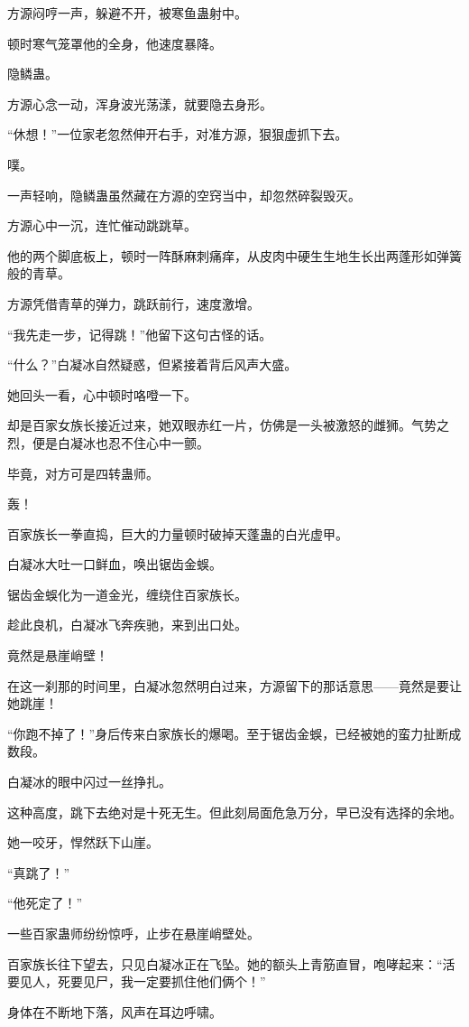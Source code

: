 \begin{this_body}
方源闷哼一声，躲避不开，被寒鱼蛊射中。

顿时寒气笼罩他的全身，他速度暴降。

隐鳞蛊。

方源心念一动，浑身波光荡漾，就要隐去身形。

“休想！”一位家老忽然伸开右手，对准方源，狠狠虚抓下去。

噗。

一声轻响，隐鳞蛊虽然藏在方源的空窍当中，却忽然碎裂毁灭。

方源心中一沉，连忙催动跳跳草。

他的两个脚底板上，顿时一阵酥麻刺痛痒，从皮肉中硬生生地生长出两蓬形如弹簧般的青草。

方源凭借青草的弹力，跳跃前行，速度激增。

“我先走一步，记得跳！”他留下这句古怪的话。

“什么？”白凝冰自然疑惑，但紧接着背后风声大盛。

她回头一看，心中顿时咯噔一下。

却是百家女族长接近过来，她双眼赤红一片，仿佛是一头被激怒的雌狮。气势之烈，便是白凝冰也忍不住心中一颤。

毕竟，对方可是四转蛊师。

轰！

百家族长一拳直捣，巨大的力量顿时破掉天蓬蛊的白光虚甲。

白凝冰大吐一口鲜血，唤出锯齿金蜈。

锯齿金蜈化为一道金光，缠绕住百家族长。

趁此良机，白凝冰飞奔疾驰，来到出口处。

竟然是悬崖峭壁！

在这一刹那的时间里，白凝冰忽然明白过来，方源留下的那话意思——竟然是要让她跳崖！

“你跑不掉了！”身后传来白家族长的爆喝。至于锯齿金蜈，已经被她的蛮力扯断成数段。

白凝冰的眼中闪过一丝挣扎。

这种高度，跳下去绝对是十死无生。但此刻局面危急万分，早已没有选择的余地。

她一咬牙，悍然跃下山崖。

“真跳了！”

“他死定了！”

一些百家蛊师纷纷惊呼，止步在悬崖峭壁处。

百家族长往下望去，只见白凝冰正在飞坠。她的额头上青筋直冒，咆哮起来：“活要见人，死要见尸，我一定要抓住他们俩个！”

身体在不断地下落，风声在耳边呼啸。


\end{this_body}
